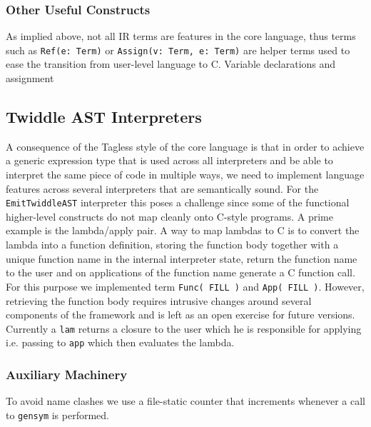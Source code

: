 \documentclass{article}
\begin{document}
\subsubsection{Other Useful Constructs}
As implied above, not all IR terms are features in the core language, thus terms such as \texttt{Ref(e: Term)} or \texttt{Assign(v: Term, e: Term)} are helper terms used to ease the transition from user-level language to C.
Variable declarations and assignment

\subsection{Twiddle AST Interpreters}\label{subsec:ast_interpreter}
A consequence of the Tagless style of the core language is that in order to achieve a generic expression type that is used across all interpreters and be able to interpret the same piece of code in multiple ways, we need to implement language features across several interpreters that are semantically sound. For the \texttt{EmitTwiddleAST} interpreter this poses a challenge since some of the functional higher-level constructs do not map cleanly onto C-style programs. A prime example is the lambda/apply pair. A way to map lambdas to C is to convert the lambda into a function definition, storing the function body together with a unique function name in the internal interpreter state, return the function name to the user and on applications of the function name generate a C function call. For this purpose we implemented term \texttt{Func( FILL )} and \texttt{App( FILL )}. However, retrieving the function body requires intrusive changes around several components of the framework and is left as an open exercise for future versions. Currently a \texttt{lam} returns a closure to the user which he is responsible for applying i.e. passing to \texttt{app} which then evaluates the lambda.

\subsubsection{Auxiliary Machinery}
To avoid name clashes we use a file-static counter that increments whenever a call to \texttt{gensym} is performed.
\end{document}
